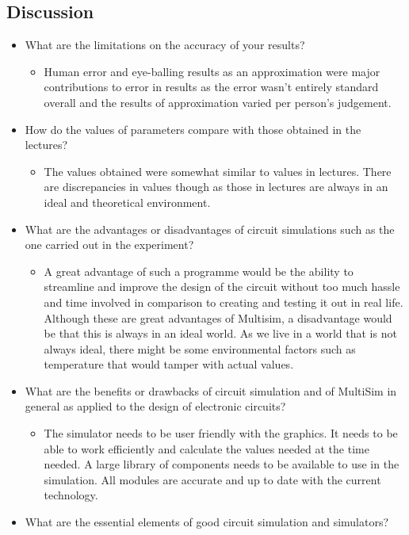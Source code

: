 \documentclass[12pt]{article}
\begin{document}
\subsection{Discussion}
\begin{itemize}
\item What are the limitations on the accuracy of your results?
\begin{itemize}
\item Human error and eye-balling results as an approximation were major contributions to error in results as the error wasn’t entirely standard overall and the results of approximation varied per person’s
judgement.
\end{itemize}
\item How do the values of parameters compare with those obtained in the lectures?
\begin{itemize}
\item The values obtained were somewhat similar to values in lectures. There are discrepancies in values though as those in lectures are always in an ideal and theoretical environment.
\end{itemize}
\item What are the advantages or disadvantages of circuit simulations such as the one carried out in the experiment?
\begin{itemize}
\item A great advantage of such a programme would be the ability to streamline and improve the design of the circuit without too much hassle and time involved in comparison to creating and testing it out
in real life. Although these are great advantages of Multisim, a disadvantage would be that this is always in an ideal world. As we live in a world that is not always ideal, there might be some environmental factors such as temperature that would tamper with actual values.
\end{itemize}
\item What are the benefits or drawbacks of circuit simulation and of MultiSim in general as applied to the design of electronic circuits?
\begin{itemize}
\item The simulator needs to be user friendly with the graphics. It needs to be able to work efficiently and calculate the values needed at the time needed. A large library of components needs to be available to use in the simulation. All modules are accurate and up to date with the current technology. 
\end{itemize}
\item What are the essential elements of good circuit simulation and simulators?

\end{itemize}
\end{document}
